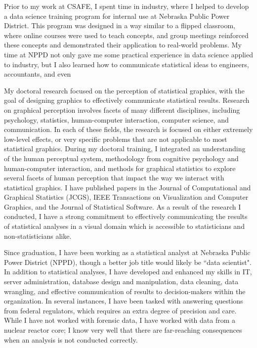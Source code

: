 \documentclass[12pt, letterpaper, sans]{moderncv}
\begin{document}
Prior to my work at CSAFE, I spent time in industry, where I helped to develop a data science training program for internal use at Nebraska Public Power District. This program was designed in a way similar to a flipped classroom, where online courses were used to teach concepts, and group meetings reinforced these concepts and demonstrated their application to real-world problems. My time at NPPD not only gave me some practical experience in data science applied to industry, but I also learned how to communicate statistical ideas to engineers, accountants, and even 

My doctoral research focused on the perception of statistical graphics, with the goal of designing graphics to effectively communicate statistical results. Research on graphical perception involves facets of many different disciplines, including psychology, statistics, human-computer interaction, computer science, and communication. In each of these fields, the research is focused on either extremely low-level effects, or very specific problems that are not applicable to most statistical graphics. During my doctoral training, I integrated an understanding of the human perceptual system, methodology from cognitive psychology and human-computer interaction, and methods for graphical statistics to explore several facets of human perception that impact the way we interact with statistical graphics. I have published papers in the Journal of Computational and Graphical Statistics (JCGS), IEEE Transactions on Visualization and Computer Graphics, and the Journal of Statistical Software. As a result of the research I conducted, I have a strong commitment to effectively communicating the results of statistical analyses in a visual domain which is accessible to statisticians and non-statisticians alike. 

Since graduation, I have been working as a statistical analyst at Nebraska Public Power District (NPPD), though a better job title would likely be ``data scientist". In addition to statistical analyses, I have developed and enhanced my skills in IT, server administration, database design and manipulation, data cleaning, data wrangling, and effective communication of results to decision-makers within the organization. In several instances, I have been tasked with answering questions from federal regulators, which requires an extra degree of precision and care. While I have not worked with forensic data, I have worked with data from a nuclear reactor core; I know very well that there are far-reaching consequences when an analysis is not conducted correctly. 
\end{document}
